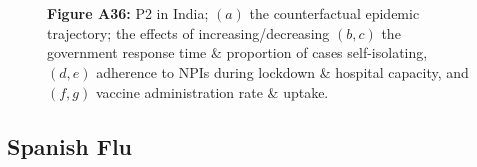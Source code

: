 \documentclass[paper=a4,fontsize=11pt]{article}
\begin{document}
\begin{figure}[!h]
  \\
  \hspace{1.76cm}
  \\
  \caption*{\textbf{Figure A36:} P2 in India; $(a)$ the counterfactual epidemic trajectory; the effects of increasing/decreasing $(b,c)$ the government response time \& proportion of cases self-isolating, $(d,e)$ adherence to NPIs during lockdown \& hospital capacity, and $(f,g)$ vaccine administration rate \& uptake.}
\end{figure}


\subsection{Spanish Flu}
\end{document}
